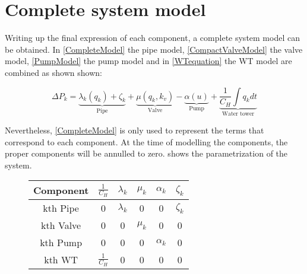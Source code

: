 \section{Complete system model} 
\label{CompleteSystemModel}

Writing up the final expression of each component, a complete system model can be obtained. In \eqref{CompleteModel} the pipe model, \eqref{CompactValveModel} the valve model,   \eqref{PumpModel} the pump model and in \eqref{WTequation} the WT model are combined as shown shown:

\begin{equation}
  \label{CompleteModel}
  \Delta P_k = \underbrace{\lambda_k (q_k) + \zeta_k}_\text{Pipe} + \underbrace{\mu (q_k, k_v)}_\text{Valve} - \underbrace{\alpha (u)}_\text{Pump} + \underbrace{\frac{1}{C_H}  \int   q_k dt }_\text{Water tower}
\end{equation}



Nevertheless, \eqref{CompleteModel} is only used to represent the terms that correspond to each component. At the time of modelling the 
components, the proper components will be annulled to zero.  shows the 
parametrization of the system.

\begin{figure}[H]
	\centering
\begin{tabular}{c|ccccc} 
  			\bfseries Component    &   $\frac{1}{C_H}$    &     $\lambda_k$    &     $\mu_k$    &     $\alpha_k$    &     $\zeta_k$  					\\ 
  			\hline
			kth Pipe		  	      &      0                    &         $\lambda_k$                            &    0                             &            0                       &      $\zeta_k$   		                         \\ 
			kth Valve           	      &      0                    &         0                            &    $\mu_k$                             &            0                       &      0    					 \\ 
			kth Pump 		      &      0                    &         0                            &    0                             &            $\alpha_k$                       &      0    				         \\ 
			kth WT                           &      $\frac{1}{C_H}$                   &         0                            &    0                             &            0                       &      0     
\end{tabular}
		\label{tab:parametrization_model}

\end{figure}	


